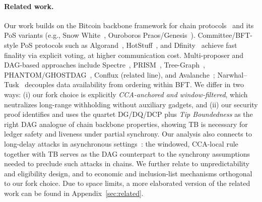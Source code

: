 \paragraph{Related work.} %
Our work builds on the Bitcoin backbone framework for chain protocols~\cite{EC:GarKiaLeo15} and its PoS variants (e.g., Snow White~\cite{FC:DaiPasShi19}, Ouroboros Praos/Genesis~\cite{EC:DGKR18,CCS:BGKRZ18}). Committee/BFT-style PoS protocols such as Algorand~\cite{Algorand}, HotStuff~\cite{HotStuff}, and Dfinity~\cite{Dfinity} achieve fast finality via explicit voting, at higher communication cost. Multi-proposer and DAG-based approaches include Spectre~\cite{EPRINT:MorKulYok18}, PRISM~\cite{Prism}, Tree-Graph~\cite{EPRINT:ZhaChaLeo18}, PHANTOM/GHOSTDAG~\cite{AFT:SWZ21}, Conflux (related line), and Avalanche~\cite{SnowFamily}; Narwhal–Tusk~\cite{NarwhalTusk} decouples data availability from ordering within BFT. We differ in two ways: (i) our fork choice is explicitly \emph{CCA-anchored and window-filtered}, which neutralizes long-range withholding without auxiliary gadgets, and (ii) our security proof identifies and uses the quartet DG/DQ/DCP plus \emph{Tip Boundedness} as the right DAG analogue of chain backbone properties, showing TB is necessary for ledger safety and liveness under partial synchrony. Our analysis also connects to long-delay attacks in asynchronous settings~\cite{EC:PasSeeShe17}: the windowed, CCA-local rule together with TB serves as the DAG counterpart to the synchrony assumptions needed to preclude such attacks in chains. We further relate to unpredictability and eligibility design, and to economic and inclusion-list mechanisms orthogonal to our fork choice. 
Due to space limits, a  more elaborated version of the related work can be found in Appendix~\ref{sec:related}. 
